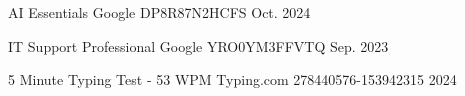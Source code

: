 
\begin{cvhonors}

  \cvhonor
    {AI Essentials} %
    {Google} %
    {DP8R87N2HCFS} %
    {Oct. 2024} %

  \cvhonor
    {IT Support Professional} %
    {Google} %
    {YRO0YM3FFVTQ} %
    {Sep. 2023} %

  \cvhonor
    {5 Minute Typing Test - 53 WPM} %
    {Typing.com} %
    {278440576-153942315} %
    {2024} %

\end{cvhonors}
